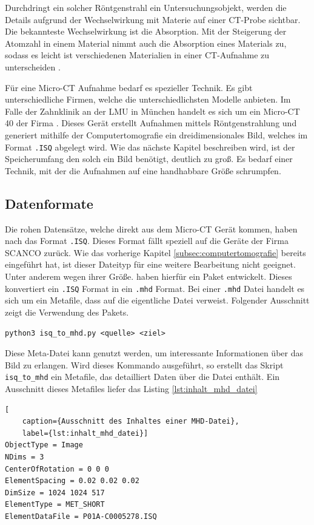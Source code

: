 Durchdringt ein solcher Röntgenstrahl ein Untersuchungsobjekt, werden die Details
aufgrund der Wechselwirkung mit Materie auf einer CT-Probe sichtbar. Die
bekannteste Wechselwirkung ist die Absorption. Mit der Steigerung der Atomzahl in
einem Material nimmt auch die Absorption eines Materials zu, sodass es leicht
ist verschiedenen Materialien in einer CT-Aufnahme zu unterscheiden \citep[vgl.][]{nib2024}.

Für eine Micro-CT Aufnahme bedarf es spezieller Technik. Es gibt
unterschiedliche Firmen, welche die unterschiedlichsten Modelle anbieten. Im
Falle der Zahnklinik an der LMU in München handelt es sich um ein Micro-CT 40
der Firma \citet{scanco2024}. Dieses Gerät erstellt Aufnahmen mittels
Röntgenstrahlung und generiert mithilfe der Computertomografie ein
dreidimensionales Bild, welches im Format \texttt{.ISQ} abgelegt wird. Wie das nächste
Kapitel beschreiben wird, ist der Speicherumfang den solch ein Bild benötigt, deutlich
zu groß. Es bedarf einer Technik, mit der die Aufnahmen auf eine handhabbare Größe
schrumpfen.

\subsection{Datenformate}
\label{subsec:datensätze} Die rohen Datensätze, welche direkt aus dem Micro-CT
Gerät kommen, haben nach \citet{scanco2024} das Format \texttt{.ISQ}. Dieses
Format fällt speziell auf die Geräte der Firma SCANCO zurück. Wie das vorherige Kapitel
\ref{subsec:computertomografie} bereits eingeführt hat, ist dieser Dateityp für
eine weitere Bearbeitung nicht geeignet. Unter anderem wegen ihrer Größe. \citet{RoeschKunzelmann2018}
haben hierfür ein Paket entwickelt. Dieses konvertiert ein \texttt{.ISQ} Format in
ein \texttt{.mhd} Format. Bei einer \texttt{.mhd} Datei handelt es sich um ein
Metafile, dass auf die eigentliche Datei verweist. Folgender Ausschnitt zeigt
die Verwendung des Pakets.

\texttt{python3 isq\_to\_mhd.py <quelle> <ziel>}

Diese Meta-Datei kann genutzt werden, um interessante Informationen über das Bild
zu erlangen. Wird dieses Kommando ausgeführt, so erstellt das Skript \texttt{isq\_to\_mhd}
ein Metafile, das detailliert Daten über die Datei enthält. Ein Ausschnitt
dieses Metafiles liefer das Listing \ref{lst:inhalt_mhd_datei}

\begin{lstlisting}[
	caption={Ausschnitt des Inhaltes einer MHD-Datei},
	label={lst:inhalt_mhd_datei}]
ObjectType = Image
NDims = 3
CenterOfRotation = 0 0 0
ElementSpacing = 0.02 0.02 0.02
DimSize = 1024 1024 517
ElementType = MET_SHORT
ElementDataFile = P01A-C0005278.ISQ
\end{lstlisting}


